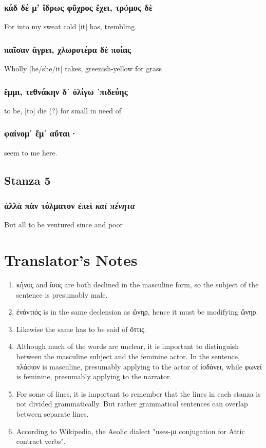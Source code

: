 \subsubsection*{κάδ δέ μ' ἴδρως φῦχρος ἔχει, τρóμος δὲ}
For into my sweat cold [it] has, trembling.

\subsubsection*{παῖσαν ἄγρει, χλωροτέρα δὲ ποίας}
Wholly [he/she/it] takes, greenish-yellow for grass

\subsubsection*{ἔμμι, τεθνάκην δ᾽ ὀλίγω ᾽πιδεύης}
to be, [to] die (?) for small in need of

\subsubsection*{φαίνομ᾽ ἔμ᾽ αὔται·}
seem to me here.

\subsection*{Stanza 5}
\subsubsection*{ἀλλὰ πὰν τόλματον ἐπεὶ \emph{καὶ πένητα}}
But all to be ventured since and poor

\section*{Translator's Notes}
\begin{enumerate}
  \item κῆνος and ἴσος are both declined in the masculine form, so the subject of the sentence is presumably male.
  \item ἐνάντιός is in the same declension as ὤνηρ, hence it must be modifying ὤνηρ.
  \item Likewise the same has to be said of ὄττις.
  \item Although much of the words are unclear, it is important to distinguish between the masculine subject and the feminine actor. In the sentence, πλάσιον is masculine, presumably applying to the actor of ἰσδάνει, while φωνεί is feminine, presumably applying to the narrator.
  \item For some of lines, it is important to remember that the lines in each stanza is not divided grammatically. But rather grammatical sentences can overlap between separate lines.
  \item According to Wikipedia, the Aeolic dialect "uses-μι conjugation for Attic contract verbs".
\end{enumerate}
